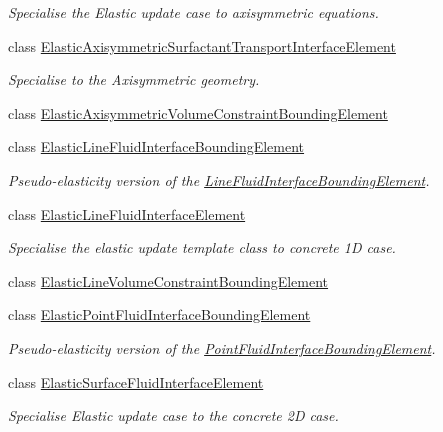 \begin{DoxyCompactItemize}
\begin{DoxyCompactList}\small\item\em Specialise the Elastic update case to axisymmetric equations. \end{DoxyCompactList}\item 
class \hyperlink{classoomph_1_1ElasticAxisymmetricSurfactantTransportInterfaceElement}{Elastic\+Axisymmetric\+Surfactant\+Transport\+Interface\+Element}
\begin{DoxyCompactList}\small\item\em Specialise to the Axisymmetric geometry. \end{DoxyCompactList}\item 
class \hyperlink{classoomph_1_1ElasticAxisymmetricVolumeConstraintBoundingElement}{Elastic\+Axisymmetric\+Volume\+Constraint\+Bounding\+Element}
\item 
class \hyperlink{classoomph_1_1ElasticLineFluidInterfaceBoundingElement}{Elastic\+Line\+Fluid\+Interface\+Bounding\+Element}
\begin{DoxyCompactList}\small\item\em Pseudo-\/elasticity version of the \hyperlink{classoomph_1_1LineFluidInterfaceBoundingElement}{Line\+Fluid\+Interface\+Bounding\+Element}. \end{DoxyCompactList}\item 
class \hyperlink{classoomph_1_1ElasticLineFluidInterfaceElement}{Elastic\+Line\+Fluid\+Interface\+Element}
\begin{DoxyCompactList}\small\item\em Specialise the elastic update template class to concrete 1D case. \end{DoxyCompactList}\item 
class \hyperlink{classoomph_1_1ElasticLineVolumeConstraintBoundingElement}{Elastic\+Line\+Volume\+Constraint\+Bounding\+Element}
\item 
class \hyperlink{classoomph_1_1ElasticPointFluidInterfaceBoundingElement}{Elastic\+Point\+Fluid\+Interface\+Bounding\+Element}
\begin{DoxyCompactList}\small\item\em Pseudo-\/elasticity version of the \hyperlink{classoomph_1_1PointFluidInterfaceBoundingElement}{Point\+Fluid\+Interface\+Bounding\+Element}. \end{DoxyCompactList}\item 
class \hyperlink{classoomph_1_1ElasticSurfaceFluidInterfaceElement}{Elastic\+Surface\+Fluid\+Interface\+Element}
\begin{DoxyCompactList}\small\item\em Specialise Elastic update case to the concrete 2D case. \end{DoxyCompactList}\item 

\end{DoxyCompactItemize}
